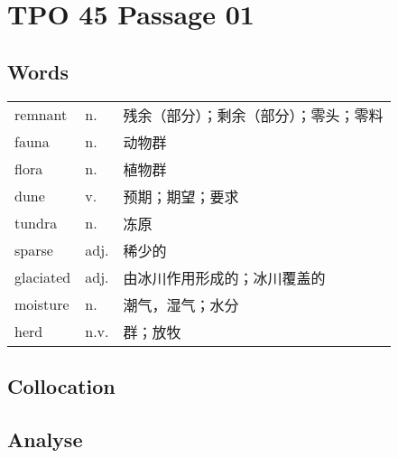 \section{TPO 45 Passage 01}

\subsection{Words}

\begin{tabular}{lll}
    remnant   & n.   & 残余（部分）；剩余（部分）；零头；零料 \\
    fauna     & n.   & 动物群                 \\
    flora     & n.   & 植物群                 \\
    dune      & v.   & 预期；期望；要求            \\
    tundra    & n.   & 冻原                  \\
    sparse    & adj. & 稀少的                 \\
    glaciated & adj. & 由冰川作用形成的；冰川覆盖的      \\
    moisture  & n.   & 潮气，湿气；水分            \\
    herd      & n.v. & 群；放牧                \\
\end{tabular}

\subsection{Collocation}


\subsection{Analyse}

